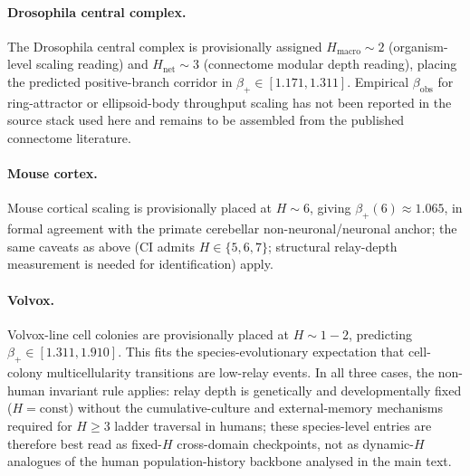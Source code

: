 \documentclass[11pt]{article}
\begin{document}
\paragraph{Drosophila central complex.}
The Drosophila central complex is provisionally assigned $H_{\mathrm{macro}}{\sim}2$ (organism-level scaling reading) and $H_{\mathrm{net}}{\sim}3$ (connectome modular depth reading), placing the predicted positive-branch corridor in $\beta_{+}{\in}[1.171,1.311]$.  Empirical $\beta_{\mathrm{obs}}$ for ring-attractor or ellipsoid-body throughput scaling has not been reported in the source stack used here and remains to be assembled from the published connectome literature.
\paragraph{Mouse cortex.}
Mouse cortical scaling is provisionally placed at $H{\sim}6$, giving $\beta_{+}(6){\approx}1.065$, in formal agreement with the primate cerebellar non-neuronal/neuronal anchor; the same caveats as above (CI admits $H{\in}\{5,6,7\}$; structural relay-depth measurement is needed for identification) apply.
\paragraph{Volvox.}
Volvox-line cell colonies are provisionally placed at $H{\sim}1{-}2$, predicting $\beta_{+}{\in}[1.311,1.910]$.  This fits the species-evolutionary expectation that cell-colony multicellularity transitions are low-relay events.  In all three cases, the non-human invariant rule applies: relay depth is genetically and developmentally fixed ($H{=}\mathrm{const}$) without the cumulative-culture and external-memory mechanisms required for $H{\ge}3$ ladder traversal in humans; these species-level entries are therefore best read as fixed-$H$ cross-domain checkpoints, not as dynamic-$H$ analogues of the human population-history backbone analysed in the main text.

\end{document}
